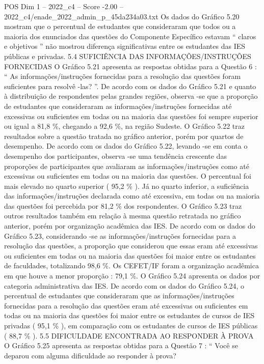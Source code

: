 \begin{textsample}{POS Dim 1 – 2022\_c4 – Score -2.00 – 2022\_c4/enade\_2022\_admin\_p\_45da234a03.txt}
Os dados do Gráfico 5.20 mostram que o percentual de estudantes que consideraram que todos ou a maioria dos enunciados das questões do Componente Específico estavam “ claros e objetivos ” não mostrou diferença significativas entre os estudantes das IES públicas e privadas. 5.4 SUFICIÊNCIA DAS INFORMAÇÕES/INSTRUÇÕES FORNECIDAS O Gráfico 5.21 apresenta as respostas obtidas para a Questão 6 : “ As informações/instruções fornecidas para a resolução das questões foram suficientes para resolvê -las? ”.
De acordo com os dados do Gráfico 5.21 e quanto à distribuição de respondentes pelas grandes regiões, observa -se que a proporção de estudantes que consideraram as informações/instruções fornecidas até excessivas ou suficientes em todas ou na maioria das questões foi sempre superior ou igual a 81,8 \%, chegando a 92,6 \%, na região Sudeste.
O Gráfico 5.22 traz resultados sobre a questão tratada no gráfico anterior, porém por quartos de desempenho.
De acordo com os dados do Gráfico 5.22, levando -se em conta o desempenho dos participantes, observa -se uma tendência crescente das proporções de participantes que avaliaram as informações/instruções como até excessivas ou suficientes em todas ou na maioria das questões.
O percentual foi mais elevado no quarto superior ( 95,2 \% ).
Já no quarto inferior, a suficiência das informações/instruções declarada como até excessiva, em todas ou na maioria das questões foi percebida por 81,2 \% dos respondentes.
O Gráfico 5.23 traz outros resultados também em relação à mesma questão retratada no gráfico anterior, porém por organização acadêmica das IES.
De acordo com os dados do Gráfico 5.23, considerando -se as informações/instruções fornecidas para a resolução das questões, a proporção que considerou que essas eram até excessivas ou suficientes em todas ou na maioria das questões foi maior entre os estudantes de faculdades, totalizando 98,6 \%.
Os CEFET/IF foram a organização acadêmica em que houve a menor proporção : 79,1 \%.
O Gráfico 5.24 apresenta os dados por categoria administrativa das IES.
De acordo com os dados do Gráfico 5.24, o percentual de estudantes que consideraram que as informações/instruções fornecidas para a resolução das questões eram até excessivas ou suficientes em todas ou na maioria das questões foi maior entre os estudantes de cursos de IES privadas ( 95,1 \% ), em comparação com os estudantes de cursos de IES públicas ( 88,7 \% ). 5.5 DIFICULDADE ENCONTRADA AO RESPONDER À PROVA O Gráfico 5.25 apresenta as respostas obtidas para a Questão 7 : “ Você se deparou com alguma dificuldade ao responder à prova?

\end{textsample}
